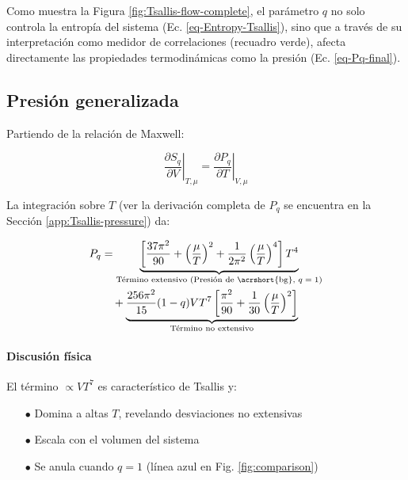 Como muestra la Figura \ref{fig:Tsallis-flow-complete}, el parámetro $q$ no solo controla la entropía del sistema (Ec. \ref{eq-Entropy-Tsallis}), sino que a través de su interpretación como medidor de correlaciones (recuadro verde), afecta directamente las propiedades termodinámicas como la presión (Ec. \ref{eq-Pq-final}).

\subsection{Presión generalizada}\label{subsec-Tsallis-pressure}

Partiendo de la relación de Maxwell:

\begin{equation}\label{eq-Maxwell-Tsallis}
    \left.\frac{\partial{S}_q}{\partial V}\right|_{T,\mu} = \left.\frac{\partial{P}_q}{\partial T}\right|_{V,\mu}
\end{equation}

La integración sobre $T$ (ver la derivación completa de $P_q$ se encuentra en la Sección \ref{app:Tsallis-pressure}) da:

\begin{equation}\label{eq-Pq-final}
    \begin{split}
    {P}_q &= \underbrace{\left[\frac{37\pi^2}{90} + \left(\frac{\mu}{T}\right)^2 + \frac{1}{2\pi^2}\left(\frac{\mu}{T}\right)^4\right]T^4}_{\text{Término extensivo (Presión de \acrshort{bg}, $q=1$)}} \\
    &\quad + \underbrace{\frac{256\pi^2}{15}(1-q)V T^7 \left[\frac{{\pi}^{2}}{90} + \frac{1}{30} \left(\frac{\mu}{T} \right)^{2} \right]}_{\text{Término no extensivo}}
    \end{split}
\end{equation}

\paragraph{Discusión física}  
El término $\propto V T^7$ es característico de Tsallis y:
\begin{itemize}
    \item[$\bullet$] Domina a altas $T$, revelando desviaciones no extensivas
    \item[$\bullet$] Escala con el volumen del sistema
    \item[$\bullet$] Se anula cuando $q=1$ (línea azul en Fig. \ref{fig:comparison})
\end{itemize}


